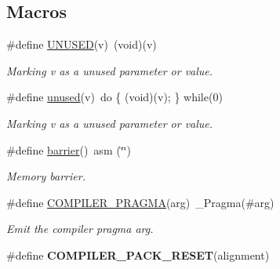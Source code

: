 \subsection*{Macros}
\begin{DoxyCompactItemize}
\item 
\hypertarget{group__group__xmega__utils_gada67c62b1c57e07efa04431bc40b9238}{\#define \hyperlink{group__group__xmega__utils_gada67c62b1c57e07efa04431bc40b9238}{U\-N\-U\-S\-E\-D}(v)~(void)(v)}\label{group__group__xmega__utils_gada67c62b1c57e07efa04431bc40b9238}

\begin{DoxyCompactList}\small\item\em Marking {\itshape v} as a unused parameter or value. \end{DoxyCompactList}\item 
\hypertarget{group__group__xmega__utils_ga417dba7f63dde98dbebd6336d8af9d91}{\#define \hyperlink{group__group__xmega__utils_ga417dba7f63dde98dbebd6336d8af9d91}{unused}(v)~do \{ (void)(v); \} while(0)}\label{group__group__xmega__utils_ga417dba7f63dde98dbebd6336d8af9d91}

\begin{DoxyCompactList}\small\item\em Marking {\itshape v} as a unused parameter or value. \end{DoxyCompactList}\item 
\hypertarget{group__group__xmega__utils_ga53290ac2df2384738b8769c76622f803}{\#define \hyperlink{group__group__xmega__utils_ga53290ac2df2384738b8769c76622f803}{barrier}()~asm (\char`\"{}\char`\"{})}\label{group__group__xmega__utils_ga53290ac2df2384738b8769c76622f803}

\begin{DoxyCompactList}\small\item\em Memory barrier. \end{DoxyCompactList}\item 
\#define \hyperlink{group__group__xmega__utils_ga85a3ab5701281268521f109ed0078668}{C\-O\-M\-P\-I\-L\-E\-R\-\_\-\-P\-R\-A\-G\-M\-A}(arg)~\-\_\-\-Pragma(\#arg)
\begin{DoxyCompactList}\small\item\em Emit the compiler pragma {\itshape arg}. \end{DoxyCompactList}\item 
\hypertarget{group__group__xmega__utils_ga750802f18d7529218f2391850a4bc6c4}{\#define {\bfseries C\-O\-M\-P\-I\-L\-E\-R\-\_\-\-P\-A\-C\-K\-\_\-\-R\-E\-S\-E\-T}(alignment)}\label{group__group__xmega__utils_ga750802f18d7529218f2391850a4bc6c4}


\end{DoxyCompactItemize}
